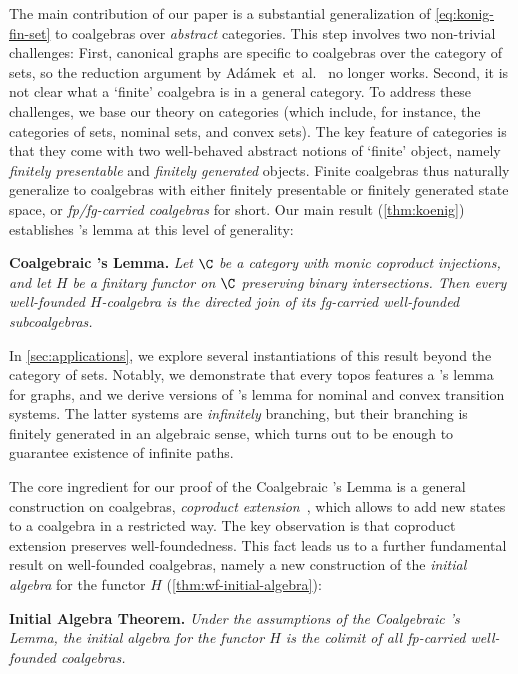\documentclass[a4paper,UKenglish, autoref, numberwithinsect, final]{lipics-v2021}
\numberwithin{equation}{section}
\theoremstyle{plain}
\theoremstyle{definition}
\begin{document}
The main contribution of our paper is a substantial generalization of \eqref{eq:konig-fin-set} to coalgebras over \emph{abstract} categories. This step involves two non-trivial challenges: First, canonical graphs are specific to coalgebras over the category of sets, so the reduction argument by Ad\'amek~et~al.~\cite{amm25} no longer works. Second, it is not clear what a `finite' coalgebra is in a general category. To address these challenges, we base our theory on \emph{\lfp} categories (which include, for instance, the categories of sets, nominal sets, and convex sets). The key feature of \lfplong categories is that they come with two well-behaved abstract notions of `finite' object, namely \emph{finitely presentable} and \emph{finitely generated} objects. Finite coalgebras thus naturally generalize to coalgebras with either finitely presentable or finitely generated state space, or \emph{fp/fg-carried coalgebras} for short. Our main result (\autoref{thm:koenig}) establishes \Konig's lemma at this level of generality:

\medskip\noindent \textsf{\bfseries Coalgebraic \Konig's Lemma.} \emph{Let $\C$ be a \lfplong category with monic coproduct injections, and let $H$ be a finitary functor on $\C$ preserving binary intersections. Then every well-founded $H$-coalgebra is the directed join of its fg-carried well-founded subcoalgebras.}

\medskip\noindent In \autoref{sec:applications}, we explore several instantiations of this result beyond the category of sets. Notably, we demonstrate that every \lfplong topos features a \Konig's lemma for graphs, and we derive versions of \Konig's lemma for nominal and convex transition systems. The latter systems are \emph{infinitely} branching, but their branching is finitely generated in an algebraic sense, which turns out to be enough to guarantee existence of infinite paths.

The core ingredient for our proof of the Coalgebraic \Konig's Lemma is a general construction on coalgebras, \emph{coproduct extension}~\cite{amv06,urbat17,lffiac,mpw16}, which allows to add new states to a coalgebra in a restricted way. The key observation is that coproduct extension preserves well-foundedness. This fact leads us to a further fundamental result on well-founded coalgebras, namely a new construction of the \emph{initial algebra} for the functor $H$ (\autoref{thm:wf-initial-algebra}):

\medskip\noindent \textsf{\bfseries Initial Algebra Theorem.} \emph{Under the assumptions of the Coalgebraic \Konig's Lemma, the initial algebra for the functor $H$ is the colimit of all fp-carried well-founded coalgebras.}
\end{document}
